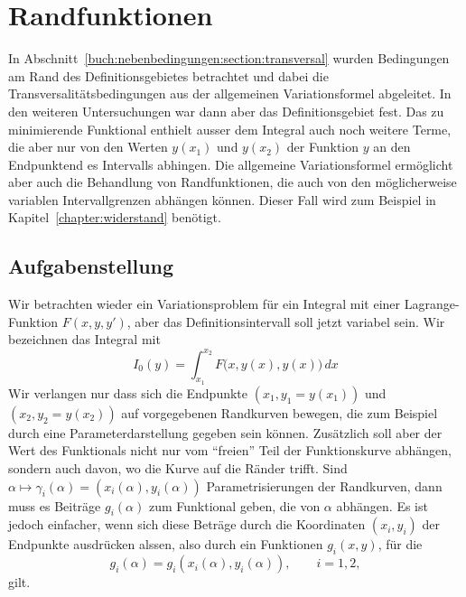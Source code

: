 %
%
%
\section{Randfunktionen
\label{buch:nebenbedingungen:section:randfunktionen}}
In Abschnitt~\ref{buch:nebenbedingungen:section:transversal} wurden
Bedingungen am Rand des Definitionsgebietes betrachtet und dabei
die Transversalitätsbedingungen aus der allgemeinen Variationsformel
abgeleitet.
In den weiteren Untersuchungen war dann aber das Definitionsgebiet
fest.
Das zu minimierende Funktional enthielt ausser dem Integral auch
noch weitere Terme, die aber nur von den Werten $y(x_1)$ und
$y(x_2)$ der Funktion $y$ an den Endpunktend es Intervalls
abhingen.
Die allgemeine Variationsformel ermöglicht aber auch die Behandlung
von Randfunktionen, die auch von den möglicherweise variablen
Intervallgrenzen abhängen können.
Dieser Fall wird zum Beispiel in Kapitel~\ref{chapter:widerstand}
benötigt.

%
%
\subsection{Aufgabenstellung
\label{buch:nebenbedingungen:randfunktionen:subsection:aufgabenstellung}}
Wir betrachten wieder ein Variationsproblem für ein Integral mit einer
Lagrange-Funktion $F(x,y,y')$, aber das Definitionsintervall soll
jetzt variabel sein.
Wir bezeichnen das Integral mit
\begin{equation*}
I_0(y)
=
\int_{x_1}^{x_2}
F\bigl(x,y(x),y(x)\bigr)\,dx
\end{equation*}
Wir verlangen nur dass sich die Endpunkte $(x_1,y_1=y(x_1))$ und 
$(x_2,y_2=y(x_2))$ auf vorgegebenen Randkurven bewegen, die zum
Beispiel durch eine Parameterdarstellung gegeben sein können.
Zusätzlich soll aber der Wert des Funktionals nicht nur vom ``freien''
Teil der Funktionskurve abhängen, sondern auch davon, wo die Kurve auf
die Ränder trifft.
Sind $\alpha\mapsto \gamma_i(\alpha) = (x_i(\alpha),y_i(\alpha))$
Parametrisierungen der Randkurven, dann muss es Beiträge $g_i(\alpha)$
zum Funktional geben, die von $\alpha$ abhängen.
Es ist jedoch einfacher, wenn sich diese Beträge durch die Koordinaten
$(x_i,y_i)$ der Endpunkte ausdrücken alssen, also durch ein Funktionen
$g_i(x,y)$, für die
\[
g_i(\alpha) = g_i(x_i(\alpha), y_i(\alpha)), \qquad i=1,2,
\]
gilt.

